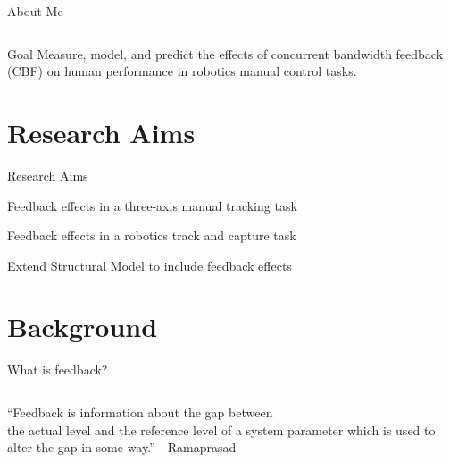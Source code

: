 \documentclass[10pt]{beamer}
\begin{document}
\begin{frame}[fragile]{About Me}
\begin{columns}[T]
\begin{column}{.4\textwidth}
    \end{column}
  \end{columns}
\end{frame}

\begin{frame}[fragile]{Goal}
  Measure, model, and predict the effects of concurrent bandwidth feedback (CBF) on human performance in robotics manual control tasks.
\end{frame}

\section{Research Aims}

\begin{frame}[fragile]{Research Aims}
  \begin{description}[align=right]
    \setlength\itemsep{1em}
    \item [Aim One] Feedback effects in a three-axis manual tracking task
    \item [Aim Two] Feedback effects in a robotics track and capture task
    \item [Aim Three] Extend Structural Model to include feedback effects
  \end{description}
\end{frame}

\section{Background}

\begin{frame}[fragile]{What is feedback?}
  \begin{columns}[T]
    \begin{column}{.8\textwidth}
      \begin{block}{}
        ``Feedback is information about the gap between\\ the actual level and the reference level of a system parameter which is used to alter the gap in some way.'' - Ramaprasad~\cite{Ramaprasad1983}
      \end{block}
    \end{column}
  \end{columns}
\end{frame}
\end{document}
